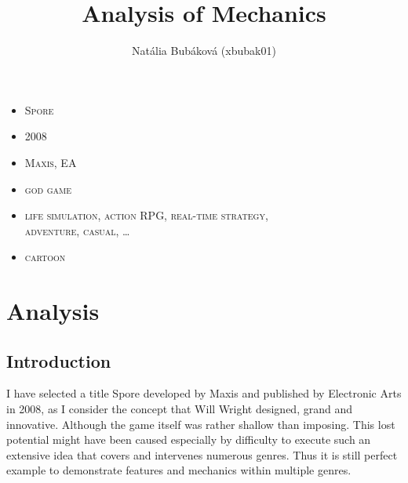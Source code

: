 \documentclass[a4paper,10pt,english]{article}
\title{%
\vspace*{-1cm}
\huge Analysis of Mechanics%
\vspace*{-0.3cm}
}
\author{%
Natália Bubáková (xbubak01)%
}
\date{}
\begin{document}
\maketitle
\thispagestyle{empty}

{%
\large
\vspace{-0.4cm}
\begin{itemize}[leftmargin = 0cm]

\item[]  \textsc{Spore}

\item[]  \textsc{2008}

\item[]  \textsc{Maxis, EA}

\item[]  \textsc{god game}

\item[]  \textsc{life simulation, action RPG, real-time strategy,\\\hspace*{4.6cm}adventure, casual, \dots}

\item[]  \textsc{cartoon}

\end{itemize}

}
\vspace*{-0.2cm}
\section*{\centering Analysis}
\vspace*{-0.1cm}
\subsection*{Introduction}

I have selected a title Spore developed by Maxis and published by Electronic Arts in 2008, as I consider the concept that Will Wright designed, grand and innovative. Although the game itself was rather shallow than imposing. This lost potential might have been caused especially by difficulty to execute such an extensive idea that covers and intervenes numerous genres. Thus it is still perfect example to demonstrate features and mechanics within multiple genres.
\end{document}
